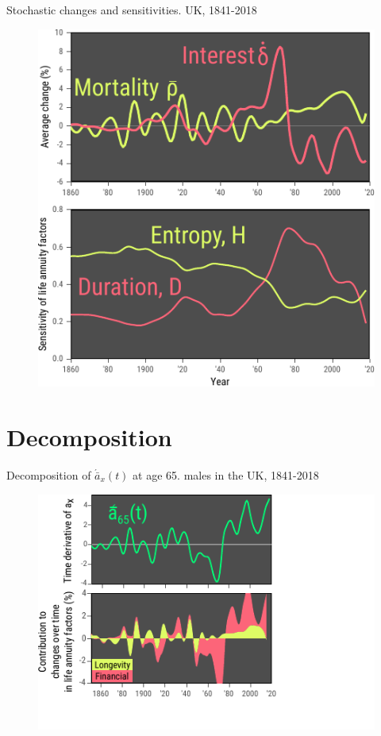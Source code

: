 \documentclass[10pt]{beamer}
\begin{document}
\begin{frame}{Stochastic changes and sensitivities. UK, 1841-2018}
\begin{figure}
	\centering
	\hspace*{-0.8cm}
	\includegraphics[scale=1] {Fig2.pdf}
\end{figure}
\end{frame}


\section{Decomposition}


\begin{frame}{Decomposition of $\acute{\bar{a}}_x(t)$ at age 65. males in the UK, 1841-2018}
\begin{figure}
	\centering
	\hspace*{-0.9cm}
	\includegraphics[scale=1.45] {Fig404.pdf}
\end{figure}
\end{frame}
\end{document}
